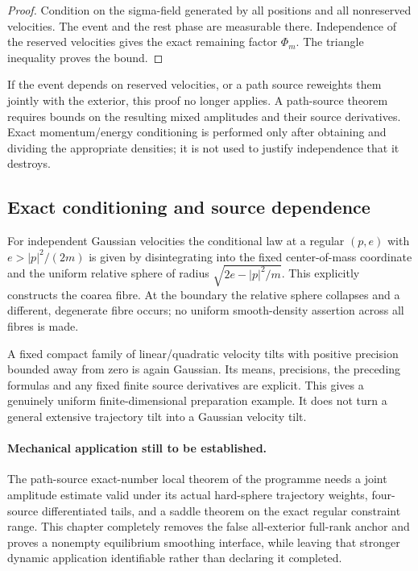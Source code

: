 \begin{proof}
Condition on the sigma-field generated by all positions and all nonreserved velocities. The event and the rest phase are measurable there. Independence of the reserved velocities gives the exact remaining factor $\Phi_m$. The triangle inequality proves the bound.
\end{proof}

If the event depends on reserved velocities, or a path source reweights them jointly with the exterior, this proof no longer applies. A path-source theorem requires bounds on the resulting mixed amplitudes and their source derivatives. Exact momentum/energy conditioning is performed only after obtaining and dividing the appropriate densities; it is not used to justify independence that it destroys.

\subsection{Exact conditioning and source dependence}
For independent Gaussian velocities the conditional law at a regular $(p,e)$ with $e>|p|^2/(2m)$ is given by disintegrating into the fixed center-of-mass coordinate and the uniform relative sphere of radius $\sqrt{2e-|p|^2/m}$. This explicitly constructs the coarea fibre. At the boundary the relative sphere collapses and a different, degenerate fibre occurs; no uniform smooth-density assertion across all fibres is made.

A fixed compact family of linear/quadratic velocity tilts with positive precision bounded away from zero is again Gaussian. Its means, precisions, the preceding formulas and any fixed finite source derivatives are explicit. This gives a genuinely uniform finite-dimensional preparation example. It does not turn a general extensive trajectory tilt into a Gaussian velocity tilt.

\paragraph{Mechanical application still to be established.}
The path-source exact-number local theorem of the programme needs a joint amplitude estimate valid under its actual hard-sphere trajectory weights, four-source differentiated tails, and a saddle theorem on the exact regular constraint range. This chapter completely removes the false all-exterior full-rank anchor and proves a nonempty equilibrium smoothing interface, while leaving that stronger dynamic application identifiable rather than declaring it completed.
